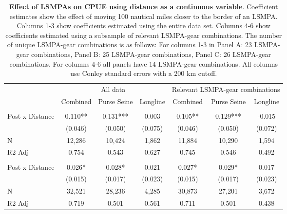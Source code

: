 \begin{table}

\caption{\label{tab:cont_treat}\textbf{Effect of LSMPAs on CPUE using distance as a continuous variable}.
             Coefficient estimates show the effect of moving 100 nautical miles closer to the border of an LSMPA.
             Columns 1-3 show coefficients estimated using the entire data set. Columns 4-6 show coefficients estimated using a subsample of relevant
             LSMPA-gear combinations. The number of unique LSMPA-gear combinations is as follows: For columns 1-3 in Panel A: 23 LSMPA-gear combinations,
             Panel B: 25 LSMPA-gear combinations, Panel C: 26 LSMPA-gear combinations. For columns 4-6 all panels have 14 LSMPA-gear combinations. All
             columns use Conley standard errors with a 200 km cutoff.}
\centering
\begin{tabular}[t]{lcccccc}
\toprule
\multicolumn{1}{c}{ } & \multicolumn{3}{c}{All data} & \multicolumn{3}{c}{Relevant LSMPA-gear combinations} \\
\cmidrule(l{3pt}r{3pt}){2-4} \cmidrule(l{3pt}r{3pt}){5-7}
 & Combined & Purse Seine & Longline & Combined & Purse Seine & Longline\\
\midrule
\addlinespace[0.3em]
\multicolumn{7}{l}{Panel A: 0-200 nautical miles}\\
\hline
\hspace{1em}Post x Distance & 0.110** & 0.131*** & 0.003 & 0.105** & 0.129*** & -0.015\\
\hspace{1em} & (0.046) & (0.050) & (0.075) & (0.046) & (0.050) & (0.072)\\
\hspace{1em}N & 12,286 & 10,424 & 1,862 & 11,884 & 10,290 & 1,594\\
\hspace{1em}R2 Adj & 0.754 & 0.543 & 0.627 & 0.745 & 0.546 & 0.492\\
\addlinespace[0.5cm]
\multicolumn{7}{l}{Panel B: 0-400 nautical miles}\\
\hline
\hspace{1em}Post x Distance & 0.026* & 0.028* & 0.021 & 0.027* & 0.029* & 0.017\\
\hspace{1em} & (0.015) & (0.017) & (0.023) & (0.015) & (0.017) & (0.023)\\
\hspace{1em}N & 32,521 & 28,236 & 4,285 & 30,873 & 27,201 & 3,672\\
\hspace{1em}R2 Adj & 0.719 & 0.501 & 0.561 & 0.711 & 0.501 & 0.438\\

\end{tabular}
\end{table}
